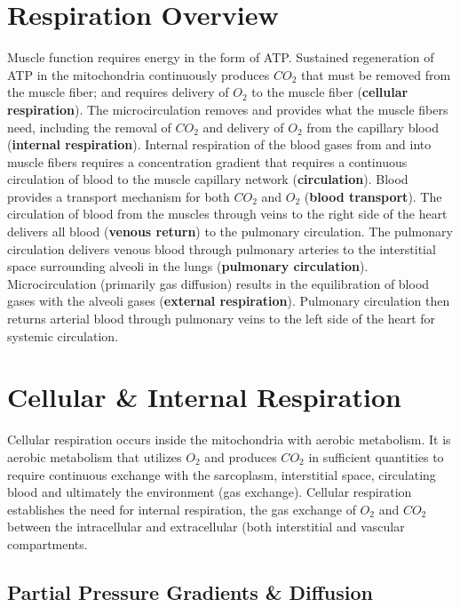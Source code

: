 \section{Respiration Overview}
Muscle function requires energy in the form of ATP. Sustained regeneration of ATP in the mitochondria continuously produces $CO_2$ that must be removed from the muscle fiber; and requires delivery of $O_2$ to the muscle fiber (\textbf{cellular respiration}). The microcirculation removes and provides what the muscle fibers need, including the removal of $CO_2$ and delivery of $O_2$ from the capillary blood (\textbf{internal respiration}). Internal respiration of the blood gases from and into muscle fibers requires a concentration gradient that requires a continuous circulation of blood to the muscle capillary network (\textbf{circulation}). Blood provides a transport mechanism for both $CO_2$ and $O_2$ (\textbf{blood transport}). The circulation of blood from the muscles through veins to the right side of the heart delivers all blood (\textbf{venous return}) to the pulmonary circulation. The pulmonary circulation delivers venous blood through pulmonary arteries to the interstitial space surrounding alveoli in the lungs (\textbf{pulmonary circulation}). Microcirculation (primarily gas diffusion) results in the equilibration of blood gases with the alveoli gases (\textbf{external respiration}). Pulmonary circulation then returns arterial blood through pulmonary veins to the left side of the heart for systemic circulation.

\section{Cellular \& Internal Respiration}

Cellular respiration occurs inside the mitochondria with aerobic metabolism. It is aerobic metabolism that utilizes $O_2$ and produces $CO_2$ in sufficient quantities to require continuous exchange with the sarcoplasm, interstitial space, circulating blood and ultimately the environment (gas exchange). Cellular respiration establishes the need for internal respiration, the gas exchange of $O_2$ and $CO_2$ between the intracellular and extracellular (both interstitial and vascular compartments.

\subsection{Partial Pressure Gradients \& Diffusion}

